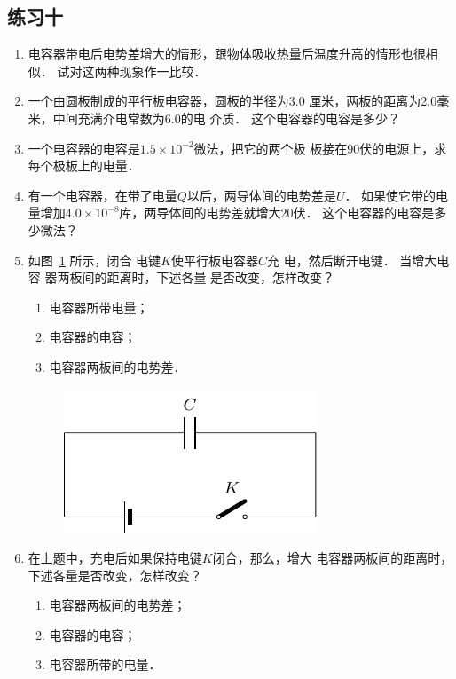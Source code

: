 \subsection*{练习十}
\begin{enumerate}
    \item 电容器带电后电势差增大的情形，跟物体吸收热量后温度升高的情形也很相似．
    试对这两种现象作一比较．
    \item 一个由圆板制成的平行板电容器，圆板的半径为3.0
厘米，两板的距离为2.0毫米，中间充满介电常数为6.0的电
介质．
这个电容器的电容是多少？
\item 一个电容器的电容是$1.5\times10^{-2}$微法，把它的两个极
板接在90伏的电源上，求每个极板上的电量．
\item 有一个电容器，在带了电量$Q$以后，两导体间的电势差是$U$．
如果使它带的电量增加$4.0\times10^{-8}$库，两导体间的电势差就增大20伏．
这个电容器的电容是多少微法？


\item 如图~\ref{fig_B_6-39} 所示，闭合
电键$K$使平行板电容器$C$充
电，然后断开电键．
当增大电容
器两板间的距离时，下述各量
是否改变，怎样改变？
\begin{enumerate}
    \item 电容器所带电量；
    \item 电容器的电容；
    \item 电容器两板间的电势差．
\end{enumerate}

\begin{figure}[htbp]
	\centering
	\includegraphics{fig/B/6-39.pdf}
	\caption{}\label{fig_B_6-39}
\end{figure}

\item 在上题中，充电后如果保持电键$K$闭合，那么，增大
电容器两板间的距离时，下述各量是否改变，怎样改变？
\begin{enumerate}
    \item 电容器两板间的电势差；
    \item 电容器的电容；
    \item 电容器所带的电量．
\end{enumerate}
\end{enumerate}

